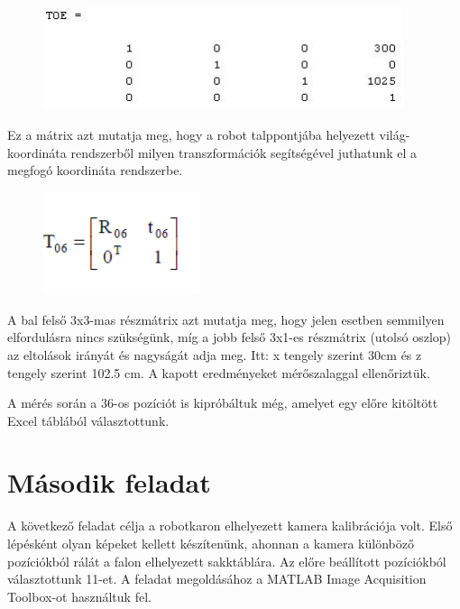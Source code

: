 \begin{figure}[!h]
	\centering
	\includegraphics[height=30mm, keepaspectratio]{figures/m06/t.jpg}
\end{figure}
Ez a mátrix azt mutatja meg, hogy a robot talppontjába helyezett világ-koordináta rendszerből milyen transzformációk segítségével juthatunk el a megfogó koordináta rendszerbe.
\begin{figure}[!h]
	\centering
	\includegraphics[height=30mm, keepaspectratio]{figures/m06/t06.png}
\end{figure}
A bal felső 3x3-mas részmátrix azt mutatja meg, hogy jelen esetben semmilyen elfordulásra nincs szükségünk, míg a jobb felső 3x1-es részmátrix (utolsó oszlop) az eltolások irányát és nagyságát adja meg. Itt: x tengely szerint 30cm és z tengely szerint 102.5 cm.
A kapott eredményeket mérőszalaggal ellenőriztük.

A mérés során a 36-os pozíciót is kipróbáltuk még, amelyet egy előre kitöltött Excel táblából választottunk.

\section{Második feladat}
A következő feladat célja a  robotkaron elhelyezett kamera kalibrációja volt. Első lépésként olyan képeket kellett készítenünk, ahonnan a kamera különböző pozíciókból rálát a falon elhelyezett sakktáblára. Az előre beállított pozíciókból választottunk 11-et. A feladat megoldásához a MATLAB Image Acquisition Toolbox-ot használtuk fel.




